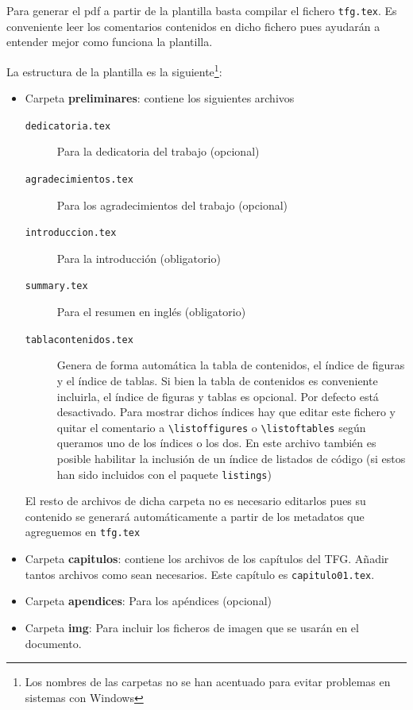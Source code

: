 Para generar el pdf a partir de la plantilla basta compilar el fichero \texttt{tfg.tex}. Es conveniente leer los comentarios contenidos en dicho fichero pues ayudarán a entender mejor como funciona la plantilla.

La estructura de la plantilla es la siguiente\footnote{Los nombres de las carpetas no se han acentuado para evitar problemas en sistemas con Windows}:
\begin{itemize}
  \item Carpeta \textbf{preliminares}: contiene los siguientes archivos
    \begin{description}
      \item[\texttt{dedicatoria.tex}] Para la dedicatoria del trabajo (opcional)
      \item[\texttt{agradecimientos.tex}] Para los agradecimientos del trabajo (opcional)
      \item[\texttt{introduccion.tex}] Para la introducción (obligatorio)
      \item[\texttt{summary.tex}] Para el resumen en inglés (obligatorio)
        \item[\texttt{tablacontenidos.tex}] Genera de forma automática la tabla de contenidos, el índice de figuras y el índice de tablas. Si bien la tabla de contenidos es conveniente incluirla, el índice de figuras y tablas es opcional. Por defecto está desactivado. Para mostrar dichos índices hay que editar este fichero y quitar el comentario a \verb+\listoffigures+ o \verb+\listoftables+ según queramos uno de los índices o los dos. En este archivo también es posible habilitar la inclusión de un índice de listados de código (si estos han sido incluidos con el paquete \texttt{listings})
    \end{description}
    El resto de archivos de dicha carpeta no es necesario editarlos pues su contenido se generará automáticamente a partir de los metadatos que agreguemos en \texttt{tfg.tex}

  \item Carpeta \textbf{capitulos}: contiene los archivos de los capítulos del TFG. Añadir tantos archivos como sean necesarios. Este capítulo es \texttt{capitulo01.tex}.

  \item Carpeta \textbf{apendices}: Para los apéndices (opcional)
  \item Carpeta \textbf{img}: Para incluir los ficheros de imagen que se usarán en el documento.


\end{itemize}
